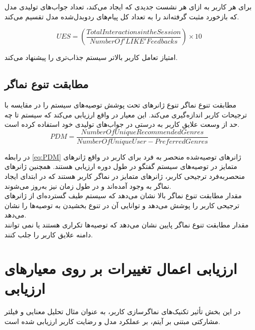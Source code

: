 برای هر کاربر به ازای هر نشست جدیدی که ایجاد می‌کند، تعداد جواب‌های تولیدی مدل که بازخورد مثبت گرفته‌اند را به تعداد کل پیام‌های ردو‌بدل‌شده مدل تقسیم می‌کند.

\begin{flushright}
\begin{equation}
UES = \left( \frac{Total Interactions in the Session}{Number Of 'LIKE' Feedbacks} \right) \times 10
\end{equation}
\end{flushright}

امتیاز تعامل کاربر بالاتر سیستم جذاب‌تری را پیشنهاد می‌کند.

\subsection[مطابقت تنوع نماگر]{مطابقت تنوع نماگر}

مطابقت تنوع نماگر تنوع ژانرهای تحت پوشش توصیه‌های سیستم را در مقایسه با ترجیحات کاربر اندازه‌گیری می‌کند. این معیار در واقع ارزیابی می‌کند که سیستم تا چه حد از وسعت علایق کاربر به درستی در جواب‌های تولیدی خود استفاده کرده است.
\begin{equation}
PDM = \frac{Number Of Unique Recommended Genres}{Number Of Unique User-Preferred Genres}
\label{eq:PDM}
\end{equation}
   

 در رابطه 
\ref{eq:PDM}
ژانرهای توصیه‌شده منحصر به فرد برای کاربر در واقع  ژانرهای متمایز در توصیه‌های سیستم گفتگو در طول دوره ارزیابی هستند. همچنین ژانرهای منحصربه‌فرد ترجیحی کاربر، ژانرهای متمایز در نماگر کاربر هستند که در ابتدای ایجاد نماگر به وجود آمده‌اند و در طول زمان نیز به‌روز می‌شوند.\\


مقدار مطابقت تنوع نماگر بالا نشان می‌دهد که سیستم طیف گسترده‌ای از ژانرهای ترجیحی کاربر را پوشش می‌دهد و توانایی آن در تنوع بخشیدن به توصیه‌ها را نشان می‌دهد.
\\
مقدار مطابقت تنوع نماگر پایین نشان می‌دهد که توصیه‌ها تکراری هستند یا نمی توانند دامنه علایق کاربر را جلب کنند.

\section{ارزیابی اعمال تغییرات بر روی معیارهای ارزیابی}

در این بخش تأثیر تکنیک‌های نماگر‌سازی کاربر، به عنوان مثال تحلیل معنایی و فیلتر مشارکتی مبتنی بر آیتم، بر عملکرد مدل و رضایت کاربر ارزیابی شده است.

